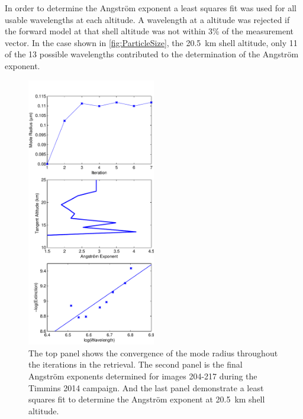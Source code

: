 In order to determine the Angstr\"{o}m exponent a least squares fit was used for all usable wavelengths at each altitude. A wavelength at a altitude was rejected if the forward model at that shell altitude was not within 3\% of the measurement vector. In the case shown in \autoref{fig:ParticleSize}, the 20.5~km shell altitude, only 11 of the 13 possible wavelengths contributed to the determination of the Angstr\"{o}m exponent.

\begin{figure}
\centering
\includegraphics[width=0.5\textwidth]{./Images/5-4-ParticelSize.pdf}
    \caption[TODO:Write This]{The top panel shows the convergence of the mode radius throughout the iterations in the retrieval. The second panel is the final Angstr\"{o}m exponents determined for images 204-217 during the Timmins 2014 campaign. And the last panel demonstrate a least squares fit to determine the Angstr\"{o}m exponent at 20.5~km shell altitude.}
    \label{fig:5.4:ParticleSize}
\end{figure} 